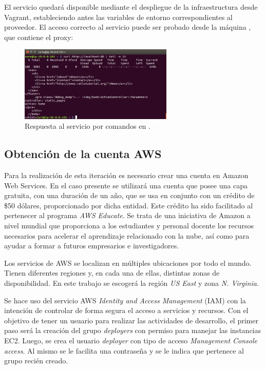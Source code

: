 El servicio quedará disponible mediante el despliegue de la infraestructura desde Vagrant, estableciendo antes las variables de entorno correspondientes al proveedor. El acceso correcto al servicio puede ser probado desde la máquina , que contiene el proxy:


\begin{figure}[H]
\centering
\includegraphics[width=0.65\textwidth]{images/figures/curl-confd.png}
\caption{Respuesta al servicio por comandos en .}
\end{figure}

\subsection{Obtención de la cuenta AWS}

Para la realización de esta iteración es necesario crear una cuenta en Amazon Web Services. En el caso presente se utilizará una cuenta que posee una capa gratuita, con una duración de un año, que se usa en conjunto con un crédito de \$50 dólares, proporcionado por dicha entidad. Este crédito ha sido facilitado al pertenecer al programa \textit{AWS Educate}. Se trata de una iniciativa de Amazon a nivel mundial que proporciona a los estudiantes y personal docente los recursos necesarios para acelerar el aprendizaje relacionado con la nube, así como para ayudar a formar a futuros empresarios e investigadores.

Los servicios de AWS se localizan en múltiples ubicaciones por todo el mundo. Tienen diferentes regiones y, en cada una de ellas, distintas zonas de disponibilidad. En este trabajo se escogerá la región \textit{US East} y zona \textit{N. Virginia}.

Se hace uso del servicio AWS \textit{Identity and Access Management} (IAM) con la intención de controlar de forma segura el acceso a servicios y recursos. Con el objetivo de tener un usuario para realizar las actividades de desarrollo, el primer paso será la creación del grupo \textit{deployers} con permiso para manejar las instancias EC2. Luego, se crea el usuario \textit{deployer} con tipo de acceso \textit{Management Console access}. Al mismo se le facilita una contraseña y se le indica que pertenece al grupo recién creado.

